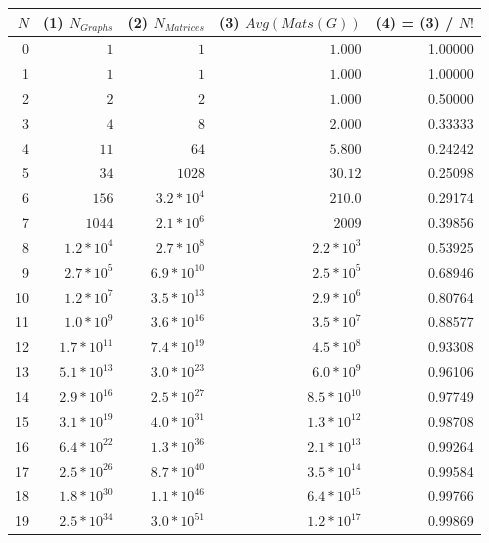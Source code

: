 \documentclass[a4paper,12pt]{article}
\begin{document}
\begin{tabular}{ r | r | r || r ||| r}
  \(N\) & (1) \(N_{Graphs}\) & (2) \(N_{Matrices}\) & (3) \(Avg(Mats(G))\) & (4) = (3) / \(N!\) \\
  \hline			
  0 & \(1\) & \(1\) & \(1.000\) & 1.00000 \\
  1 & \(1\) & \(1\) & \(1.000\) & 1.00000 \\
  2 & \(2\) & \(2\) & \(1.000\) & 0.50000 \\
  3 & \(4\) & \(8\) & \(2.000\) & 0.33333 \\
  4 & \(11\) & \(64\) & \(5.800\) & 0.24242 \\
  5 & \(34\) & \(1028\) & \(30.12\) & 0.25098 \\
  6 & \(156\) & \(3.2 * 10^4\) & \(210.0\) & 0.29174 \\
  7 & \(1044\) & \(2.1 * 10^6\) & \(2009\) & 0.39856 \\
  8 & \(1.2 * 10^{4}\) & \(2.7 * 10^{8}\) & \(2.2 * 10^{3}\) & 0.53925 \\
  9 & \(2.7 * 10^{5}\) & \(6.9 * 10^{10}\) & \(2.5 * 10^{5}\) & 0.68946 \\
  10 & \(1.2 * 10^{7}\) & \(3.5 * 10^{13}\) & \(2.9 * 10^{6}\) & 0.80764 \\
  11 & \(1.0 * 10^{9}\) & \(3.6 * 10^{16}\) & \(3.5 * 10^{7}\) & 0.88577 \\
  12 & \(1.7 * 10^{11}\) & \(7.4 * 10^{19}\) & \(4.5 * 10^{8}\) & 0.93308 \\
  13 & \(5.1 * 10^{13}\) & \(3.0 * 10^{23}\) & \(6.0 * 10^{9}\) & 0.96106 \\
  14 & \(2.9 * 10^{16}\) & \(2.5 * 10^{27}\) & \(8.5 * 10^{10}\) & 0.97749 \\
  15 & \(3.1 *10^{19}\) & \(4.0 * 10^{31}\) & \(1.3 * 10^{12}\) & 0.98708 \\
  16 & \(6.4 * 10^{22}\) & \(1.3 * 10^{36}\) & \(2.1 * 10^{13}\) & 0.99264 \\
  17 & \(2.5 * 10^{26}\) & \(8.7 * 10^{40}\) & \(3.5 * 10^{14}\) & 0.99584 \\
  18 & \(1.8 * 10^{30}\) & \(1.1 * 10^{46}\) & \(6.4 * 10^{15}\) & 0.99766 \\
  19 & \(2.5 * 10^{34}\) & \(3.0 * 10^{51}\) & \(1.2 * 10^{17}\) & 0.99869 \\
  \hline  
\end{tabular}
\end{document}
